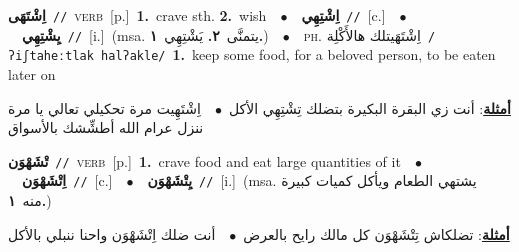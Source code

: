 \documentclass[10pt,a4paper,twoside]{article} %
\begin{document}
\begin{multicols}{2}
{\setlength\topsep{0pt}\textbf{\foreignlanguage{arabic}{اِشْتَهَى}}\ {\color{gray}\texttt{//}\color{black}}\ \textsc{verb}\ [p.]\ \textbf{1.}~crave sth.  \textbf{2.}~wish\ \ $\bullet$\ \ \setlength\topsep{0pt}\textbf{\foreignlanguage{arabic}{اِشْتِهِي}}\ {\color{gray}\texttt{//}\color{black}}\ [c.]\ \ $\bullet$\ \ \setlength\topsep{0pt}\textbf{\foreignlanguage{arabic}{يِشْتِهِي}}\ {\color{gray}\texttt{//}\color{black}}\ [i.]\ \color{gray}(msa. \foreignlanguage{arabic}{يتمنَّى}~\foreignlanguage{arabic}{\textbf{٢.}}  \foreignlanguage{arabic}{يَشْتِهِي}~\foreignlanguage{arabic}{\textbf{١.}})\color{black}\ \ $\bullet$\ \ \textsc{ph.} \color{gray} \foreignlanguage{arabic}{اِشْتَهَيتلك هالأَكْلِة}\color{black}\ {\color{gray}\texttt{/{\sffamily ʔiʃtaheːtlak halʔakle}/}\color{black}}\ \textbf{1.}~keep some food, for a beloved person, to be eaten later on\  \begin{flushright}\color{gray}\foreignlanguage{arabic}{\textbf{\underline{\foreignlanguage{arabic}{أمثلة}}}: أنت زي البقرة البكيرة بتضلك تِشْتِهِي الأكل\ $\bullet$\ \  اِشْتَهِيت مرة تحكيلي تعالي يا مرة ننزل عرام الله أطشِّشك بالأسواق}\end{flushright}\color{black}} \vspace{2mm}

{\setlength\topsep{0pt}\textbf{\foreignlanguage{arabic}{تْشَهْوَن}}\ {\color{gray}\texttt{//}\color{black}}\ \textsc{verb}\ [p.]\ \textbf{1.}~crave food and eat large quantities of it\ \ $\bullet$\ \ \setlength\topsep{0pt}\textbf{\foreignlanguage{arabic}{اِتْشَهْوَن}}\ {\color{gray}\texttt{//}\color{black}}\ [c.]\ \ $\bullet$\ \ \setlength\topsep{0pt}\textbf{\foreignlanguage{arabic}{يِتْشَهْوَن}}\ {\color{gray}\texttt{//}\color{black}}\ [i.]\ \color{gray}(msa. \foreignlanguage{arabic}{يشتهي الطعام ويأكل كميات كبيرة منه}~\foreignlanguage{arabic}{\textbf{١.}})\color{black}\  \begin{flushright}\color{gray}\foreignlanguage{arabic}{\textbf{\underline{\foreignlanguage{arabic}{أمثلة}}}: تضلكاش تِتْشَهْوَن كل مالك رايح بالعرض\ $\bullet$\ \  أنت ضلك اِتْشَهْوَن واحنا ننبلي بالأكل}\end{flushright}\color{black}} \vspace{2mm}


\end{multicols}
\end{document}

